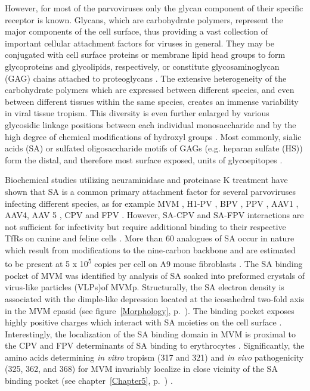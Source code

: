 However, for most of the parvoviruses only the glycan component of their specific receptor is known. Glycans, which are carbohydrate polymers, represent the major components of the cell surface, thus providing a vast collection of important cellular attachment factors for viruses in general. They may be conjugated with cell surface proteins or membrane lipid head groups to form glycoproteins and glycolipids, respectively, or constitute glycosaminoglycan (GAG) chains attached to proteoglycans \cite{pmid16019714}. The extensive heterogeneity of the carbohydrate polymers which are expressed between different species, and even between different tissues within the same species, creates an immense variability in viral tissue tropism. This diversity is even further enlarged by various glycosidic linkage positions between each individual monosaccharide and by the high degree of chemical modifications of hydroxyl groups \cite{pmid11841250, pmid17632542}. Most commonly, sialic acids (SA) or sulfated oligosaccharide motifs of GAGs (e.g. heparan sulfate (HS)) form the distal, and therefore most surface exposed, units of glycoepitopes \cite{pmid17072005}.


Biochemical studies utilizing neuraminidase and proteinase K treatment have shown that SA is a common primary attachment factor for several parvoviruses infecting different species, as for example MVM \cite{pmid3296697, pmid16415031}, H1-PV \cite{pmid22258256}, BPV \cite{pmid15750863, pmid9747725, pmid15269359}, PPV \cite{pmid20484503}, AAV1 \cite{pmid16943302, pmid16940521}, AAV4, AAV 5 \cite{pmid15761263, pmid11435568, pmid11262413, pmid16409121}, CPV and FPV \cite{pmid1329321, pmid7975239}. However, SA-CPV and SA-FPV interactions are not sufficient for infectivity but require additional binding to their respective TfRs on canine and feline cells \cite{pmid1329321, pmid12525605, pmid11264378, pmid12885908}. More than 60 analogues of SA occur in nature which result from modifications to the nine-carbon backbone \cite{pmid17072005} and are estimated to be present at 5 x 10\textsuperscript{5} copies per cell on A9 mouse fibroblasts \cite{pmid20517, pmid6602221}. The SA binding pocket of MVM was identified by analysis of SA soaked into preformed crystals of virus-like particles (VLPs)\footnotemark of MVMp. Structurally, the SA electron density is associated with the dimple-like depression located at the icosahedral two-fold axis in the MVM cpasid (see figure~\ref{Morphology}, p.~\pageref{Morphology}). The binding pocket exposes highly positive charges which interact with SA moieties on the cell surface \cite{pmid16415031}. Interestingly, the localization of the SA binding domain in MVM is proximal to the CPV and FPV determinants of SA binding to erythrocytes \cite{pmid7645206, pmid8392729, pmid1329321, pmid10884355}. Significantly, the amino acids determining \textit{in vitro} tropism (317 and 321) and \textit{in vivo} pathogenicity (325, 362, and 368) for MVM invariably localize in close vicinity of the SA binding pocket (see chapter~\ref{Chapter5}, p.~\pageref{Chapter5}) \cite{pmid16103145}.                  

